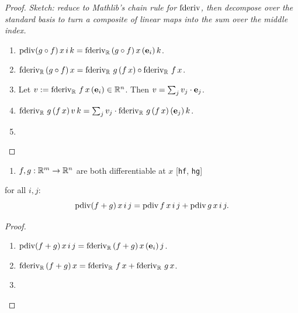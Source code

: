 \begin{proof}
\leanok
\emph{Sketch: reduce to Mathlib's chain rule for \(\operatorname{fderiv}\), then
decompose over the standard basis to turn a composite of linear maps
into the sum over the middle index.}
\begin{enumerate}
  \item \(\operatorname{pdiv}(g \circ f)\, x\, i\, k
          = \operatorname{fderiv}_{\mathbb{R}}\,(g \circ f)\, x\, (\mathbf{e}_i)\, k\).
  \item \(\operatorname{fderiv}_{\mathbb{R}}\,(g \circ f)\, x
          = \operatorname{fderiv}_{\mathbb{R}}\, g\, (f\,x) \circ \operatorname{fderiv}_{\mathbb{R}}\, f\, x\).
  \item Let \(v := \operatorname{fderiv}_{\mathbb{R}}\, f\, x\, (\mathbf{e}_i) \in \mathbb{R}^{n}\).
    Then \(v = \sum_j v_j \cdot \mathbf{e}_j\).
  \item \(\operatorname{fderiv}_{\mathbb{R}}\, g\, (f\,x)\, v\, k
          = \sum_j v_j \cdot \operatorname{fderiv}_{\mathbb{R}}\, g\, (f\,x)\, (\mathbf{e}_j)\, k\).
  \item \Qed{}
\end{enumerate}
\end{proof}

\begin{theorem}
  \label{ax:pdiv_add}
  \leanok
  \Assume{}
  \begin{enumerate}
    \item \(f, g : \mathbb{R}^{m} \to \mathbb{R}^{n}\) are both differentiable at
          \(x\) \hfill[\texttt{hf}, \texttt{hg}]
  \end{enumerate}
  \Prove{} for all \(i, j\):
  \[
    \operatorname{pdiv}(f + g)\, x\, i\, j = \operatorname{pdiv} f\, x\, i\, j + \operatorname{pdiv} g\, x\, i\, j.
  \]
\end{theorem}

\begin{proof}
\leanok
\begin{enumerate}
  \item \(\operatorname{pdiv}(f + g)\, x\, i\, j
          = \operatorname{fderiv}_{\mathbb{R}}\,(f + g)\, x\, (\mathbf{e}_i)\, j\).
  \item \(\operatorname{fderiv}_{\mathbb{R}}\,(f + g)\, x
          = \operatorname{fderiv}_{\mathbb{R}}\, f\, x + \operatorname{fderiv}_{\mathbb{R}}\, g\, x\).
  \item \Qed{}
\end{enumerate}
\end{proof}


